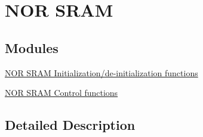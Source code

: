 \hypertarget{group___f_m_c___l_l___n_o_r_s_r_a_m}{}\section{N\+OR S\+R\+AM}
\label{group___f_m_c___l_l___n_o_r_s_r_a_m}
\subsection*{Modules}
\begin{DoxyCompactItemize}
\item 
\hyperlink{group___f_m_c___l_l___n_o_r_s_r_a_m___private___functions___group1}{N\+O\+R S\+R\+A\+M Initialization/de-\/initialization functions}
\item 
\hyperlink{group___f_m_c___l_l___n_o_r_s_r_a_m___private___functions___group2}{N\+O\+R S\+R\+A\+M Control functions}
\end{DoxyCompactItemize}


\subsection{Detailed Description}

